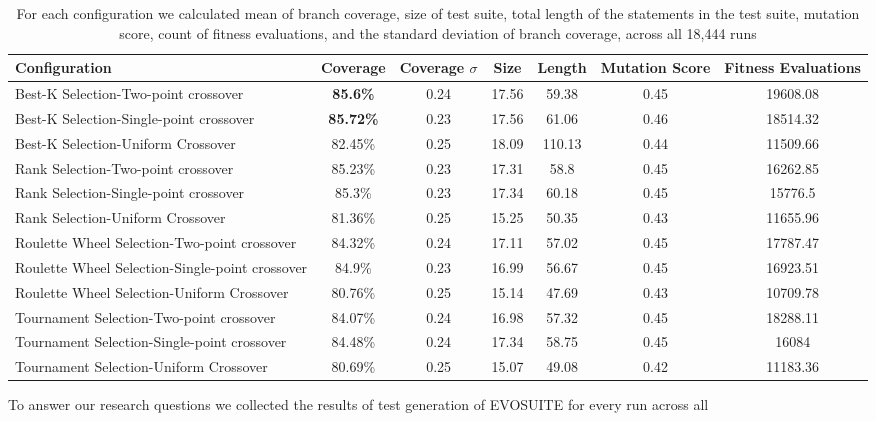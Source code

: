 \documentclass[sigconf]{acmart}
\begin{document}
\begin{table}[h!t]
  \caption{For each configuration we calculated mean of branch coverage, size of test suite, 
  total length of the statements in the test suite, mutation score, count of fitness evaluations, 
  and the standard deviation of branch coverage, across all 18,444 runs}
  \label{tab:allresults}
  \begin{tabular}{lcccccc}
    \toprule
    Configuration&Coverage&Coverage $\sigma$ &Size&Length&Mutation Score&Fitness Evaluations\\
    \midrule
    Best-K Selection-Two-point crossover           &\textbf{85.6\%} & 0.24 & 17.56 & 59.38  &0.45 & 19608.08 \\
    Best-K Selection-Single-point crossover        &\textbf{85.72\%}& 0.23 & 17.56 & 61.06  &0.46 & 18514.32 \\
    Best-K Selection-Uniform Crossover             &82.45\%         & 0.25 & 18.09 & 110.13 &0.44 & 11509.66 \\
    \midrule
    Rank Selection-Two-point crossover             &85.23\%         & 0.23 & 17.31 & 58.8   &0.45 & 16262.85 \\
    Rank Selection-Single-point crossover          &85.3\%          & 0.23 & 17.34 & 60.18  &0.45 & 15776.5  \\
    Rank Selection-Uniform Crossover               &81.36\%         & 0.25 & 15.25 & 50.35  &0.43 & 11655.96 \\
    \midrule
    Roulette Wheel Selection-Two-point crossover   &84.32\%         & 0.24 & 17.11 & 57.02  &0.45 & 17787.47 \\
    Roulette Wheel Selection-Single-point crossover&84.9\%          & 0.23 & 16.99 & 56.67  &0.45 & 16923.51 \\
    Roulette Wheel Selection-Uniform Crossover     &80.76\%         & 0.25 & 15.14 & 47.69  &0.43 & 10709.78 \\
    \midrule
    Tournament Selection-Two-point crossover       &84.07\%         & 0.24 & 16.98 & 57.32  &0.45 & 18288.11 \\
    Tournament Selection-Single-point crossover    &84.48\%         & 0.24 & 17.34 & 58.75  &0.45 & 16084    \\
    Tournament Selection-Uniform Crossover         &80.69\%         & 0.25 & 15.07 & 49.08  &0.42 & 11183.36 \\
    \bottomrule
  \end{tabular}
\end{table}
To answer our research questions we collected the results of test generation of EVOSUITE for every run across all 
\end{document}
